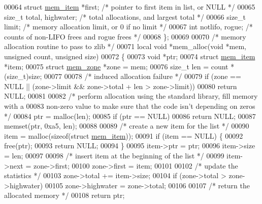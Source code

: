 \begin{DoxyCode}
00064     \textcolor{keyword}{struct }\hyperlink{structmem__item}{mem\_item} *first;     \textcolor{comment}{/* pointer to first item in list, or NULL */}
00065     \textcolor{keywordtype}{size\_t} total, highwater;    \textcolor{comment}{/* total allocations, and largest total */}
00066     \textcolor{keywordtype}{size\_t} limit;               \textcolor{comment}{/* memory allocation limit, or 0 if no limit */}
00067     \textcolor{keywordtype}{int} notlifo, rogue;         \textcolor{comment}{/* counts of non-LIFO frees and rogue frees */}
00068 \};
00069 
00070 \textcolor{comment}{/* memory allocation routine to pass to zlib */}
00071 local \textcolor{keywordtype}{void} *mem\_alloc(\textcolor{keywordtype}{void} *mem, \textcolor{keywordtype}{unsigned} count, \textcolor{keywordtype}{unsigned} size)
00072 \{
00073     \textcolor{keywordtype}{void} *ptr;
00074     \textcolor{keyword}{struct }\hyperlink{structmem__item}{mem\_item} *item;
00075     \textcolor{keyword}{struct }\hyperlink{structmem__zone}{mem\_zone} *zone = mem;
00076     \textcolor{keywordtype}{size\_t} len = count * (size\_t)size;
00077 
00078     \textcolor{comment}{/* induced allocation failure */}
00079     \textcolor{keywordflow}{if} (zone == NULL || (zone->limit && zone->total + len > zone->limit))
00080         \textcolor{keywordflow}{return} NULL;
00081 
00082     \textcolor{comment}{/* perform allocation using the standard library, fill memory with a}
00083 \textcolor{comment}{       non-zero value to make sure that the code isn't depending on zeros */}
00084     ptr = malloc(len);
00085     \textcolor{keywordflow}{if} (ptr == NULL)
00086         \textcolor{keywordflow}{return} NULL;
00087     memset(ptr, 0xa5, len);
00088 
00089     \textcolor{comment}{/* create a new item for the list */}
00090     item = malloc(\textcolor{keyword}{sizeof}(\textcolor{keyword}{struct} \hyperlink{structmem__item}{mem\_item}));
00091     \textcolor{keywordflow}{if} (item == NULL) \{
00092         free(ptr);
00093         \textcolor{keywordflow}{return} NULL;
00094     \}
00095     item->ptr = ptr;
00096     item->size = len;
00097 
00098     \textcolor{comment}{/* insert item at the beginning of the list */}
00099     item->next = zone->first;
00100     zone->first = item;
00101 
00102     \textcolor{comment}{/* update the statistics */}
00103     zone->total += item->size;
00104     \textcolor{keywordflow}{if} (zone->total > zone->highwater)
00105         zone->highwater = zone->total;
00106 
00107     \textcolor{comment}{/* return the allocated memory */}
00108     \textcolor{keywordflow}{return} ptr;

\end{DoxyCode}
